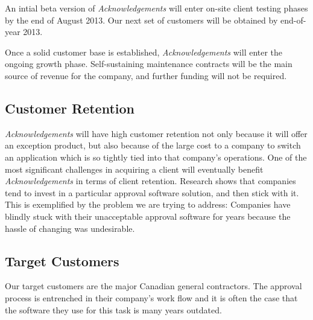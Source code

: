 An intial beta version of {\it Acknowledgements} will enter on-site client testing phases by the end of August 2013. Our next set of customers will be obtained by end-of-year 2013.

Once a solid customer base is established, {\it Acknowledgements} will enter the ongoing growth phase. Self-sustaining maintenance contracts will be the main source of revenue for the company, and further funding will not be required.




\subsection{Customer Retention}
{\it Acknowledgements} will have high customer retention not only because it will offer an exception product, but also because of the large cost to a company to switch an application which is so tightly tied into that company's operations. One of the most significant challenges in acquiring a client will eventually benefit {\it Acknowledgements} in terms of client retention. Research shows that companies tend to invest in a particular approval software solution, and then stick with it. This is exemplified by the problem we are trying to address: Companies have blindly stuck with their unacceptable approval software for years because the hassle of changing was undesirable.

\subsection{Target Customers}
Our target customers are the major Canadian general contractors. The approval process is entrenched in their company's work flow and it is often the case that the software they use for this task is many years outdated. 

